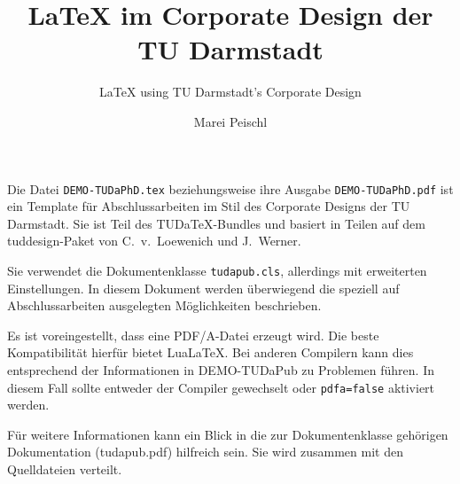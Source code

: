 \documentclass[
	ngerman,
	ruledheaders=chapter,%
	class=book,%
	thesis={
		type=dr,
		dr=rernat
	},
	accentcolor=9c,%
	custommargins=true,%
	marginpar=false,%
	parskip=half-,%
	fontsize=11pt,%
]{tudapub}
\def\TUDaTeX{TUDa\TeX}
\let\file\texttt
\let\code\texttt
\begin{document}
	
	
	
\frontmatter
	
\title{\LaTeX{} im Corporate Design der TU Darmstadt}
\subtitle{\LaTeX{} using TU Darmstadt's Corporate Design}
\author[M. Peischl]{Marei Peischl}%
	
	

	
\submissiondate{\today}
\examdate{\today}
	
\dedication{For \TeX{} \& Friends}
	
\maketitle

\affidavit
	
Die Datei \file{DEMO-TUDaPhD.tex} beziehungsweise ihre Ausgabe \file{DEMO-TUDaPhD.pdf} ist ein Template für Abschlussarbeiten im Stil des Corporate Designs der TU Darmstadt.
Sie ist Teil des \TUDaTeX-Bundles und basiert in Teilen auf dem tuddesign-Paket von C.~v.~Loewenich und J.~Werner. 

Sie verwendet die Dokumentenklasse \file{tudapub.cls}, allerdings mit erweiterten Einstellungen. In diesem Dokument werden überwiegend die speziell auf Abschlussarbeiten ausgelegten Möglichkeiten beschrieben.
	
Es ist voreingestellt, dass eine PDF/A-Datei erzeugt wird. Die beste Kompatibilität hierfür bietet Lua\LaTeX. Bei anderen Compilern kann dies entsprechend der Informationen in DEMO-TUDaPub zu Problemen führen. In diesem Fall sollte entweder der Compiler gewechselt oder \code{pdfa=false} aktiviert werden.
	
Für weitere Informationen kann ein Blick in die zur Dokumentenklasse gehörigen Dokumentation (tudapub.pdf) hilfreich sein. Sie wird zusammen mit den Quelldateien verteilt.
	
\end{document}
